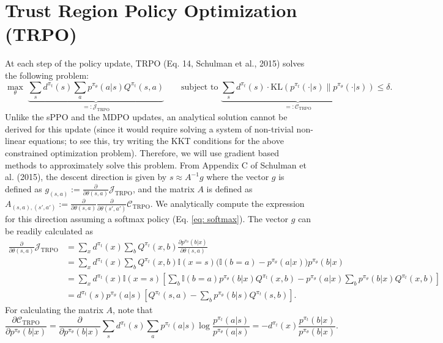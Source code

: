 \documentclass[a4paper, 10pt]{article}
\begin{document}
\section{Trust Region Policy Optimization (TRPO)}
At each step of the policy update, TRPO (Eq. 14, Schulman et al., 2015) solves the following problem:
\begin{equation}
  \max_\theta \; \underbrace{\sum_s d^{\pi_t}(s) \sum_a p^{\pi_\theta}(a | s) Q^{\pi_t}(s, a)}_{=: \mathcal{J}_{\text{TRPO}}} \qquad \text{subject to } \underbrace{\sum_s d^{\pi_t}(s) \cdot \text{KL}(p^{\pi_t}(\cdot | s) \| p^{\pi_\theta}(\cdot | s))}_{=: \mathcal{C}_{\text{TRPO}}} \leq \delta.  
\end{equation}
Unlike the sPPO and the MDPO updates, an analytical solution cannot be derived for this update (since it would require solving a system of non-trivial non-linear equations; to see this, try writing the KKT conditions for the above constrained optimization problem). Therefore, we will use gradient based methods to approximately solve this problem. From Appendix C of Schulman et al. (2015), the descent direction is given by $s \approx A^{-1} g$ where the vector $g$ is defined as $g_{(s, a)} := \frac{\partial}{\partial \theta(s, a)} \mathcal{J}_{\text{TRPO}}$, and the matrix $A$ is defined as $A_{(s, a), (s', a')} := \frac{\partial}{\partial \theta(s, a)} \frac{\partial}{\partial \theta(s', a')} \mathcal{C}_{\text{TRPO}}$. We analytically compute the expression for this direction assuming a softmax policy (Eq. \ref{eq: softmax}). The vector $g$ can be readily calculated as
\begin{align}
  \frac{\partial}{\partial \theta(s, a)} \mathcal{J}_{\text{TRPO}} &= \sum_x d^{\pi_t}(x) \sum_b Q^{\pi_t}(x, b) \frac{\partial p^{\pi_\theta}(b | x)}{\partial \theta(s, a)} \nonumber \\
  &= \sum_x d^{\pi_t}(x) \sum_b Q^{\pi_t}(x, b) \mathbb{I}(x = s) \Big( \mathbb{I}(b = a) - p^{\pi_\theta}(a | x) \Big) p^{\pi_\theta}(b | x) \nonumber \\
  &= \sum_x d^{\pi_t}(x) \mathbb{I}(x = s) \left[ \sum_b \mathbb{I}(b = a) p^{\pi_\theta}(b | x) Q^{\pi_t}(x, b) - p^{\pi_\theta}(a | x) \sum_b p^{\pi_\theta}(b | x) Q^{\pi_t}(x, b) \right] \nonumber \\
  &= d^{\pi_t}(s) p^{\pi_\theta}(a | s) \left[ Q^{\pi_t}(s, a) - \sum_b p^{\pi_\theta}(b | s) Q^{\pi_t}(s, b) \right]. \label{eq: trpo_gradient}
\end{align}
For calculating the matrix $A$, note that
\begin{equation*}
  \frac{\partial \mathcal{C}_{\text{TRPO}}}{\partial p^{\pi_\theta}(b | x)} = \frac{\partial}{\partial p^{\pi_\theta}(b | x)} \sum_s d^{\pi_t}(s) \sum_a p^{\pi_t}(a | s) \log \frac{p^{\pi_t}(a | s)}{p^{\pi_\theta}(a | s)} = - d^{\pi_t}(x) \frac{p^{\pi_t}(b | x)}{p^{\pi_\theta}(b | x)}.
\end{equation*}
\end{document}
